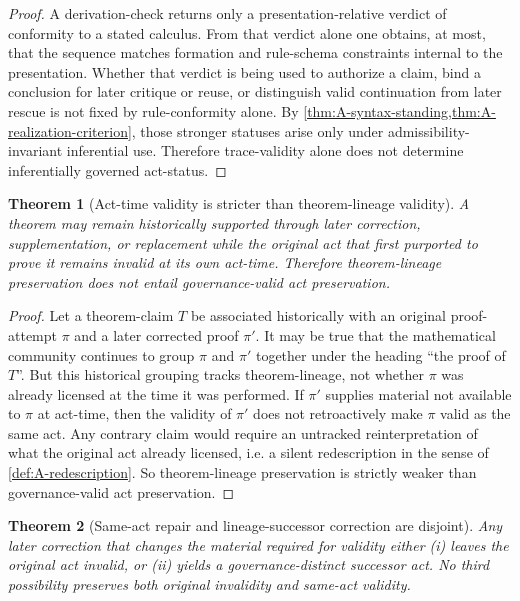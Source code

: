 \documentclass[11pt]{article}
\theoremstyle{plain}
\newtheorem{theorem}{Theorem}[section]
\theoremstyle{definition}
\begin{document}
\begin{proof}
A derivation-check returns only a presentation-relative verdict of conformity to a stated calculus. From that verdict alone one obtains, at most, that the sequence matches formation and rule-schema constraints internal to the presentation. Whether that verdict is being used to authorize a claim, bind a conclusion for later critique or reuse, or distinguish valid continuation from later rescue is not fixed by rule-conformity alone. By \cref{thm:A-syntax-standing,thm:A-realization-criterion}, those stronger statuses arise only under admissibility-invariant inferential use. Therefore trace-validity alone does not determine inferentially governed act-status.
\end{proof}

\begin{theorem}[Act-time validity is stricter than theorem-lineage validity]
\label{thm:A-acttime-stricter}
A theorem may remain historically supported through later correction, supplementation, or replacement while the original act that first purported to prove it remains invalid at its own act-time. Therefore theorem-lineage preservation does not entail governance-valid act preservation.
\end{theorem}

\begin{proof}
Let a theorem-claim $T$ be associated historically with an original proof-attempt $\pi$ and a later corrected proof $\pi'$. It may be true that the mathematical community continues to group $\pi$ and $\pi'$ together under the heading ``the proof of $T$''. But this historical grouping tracks theorem-lineage, not whether $\pi$ was already licensed at the time it was performed. If $\pi'$ supplies material not available to $\pi$ at act-time, then the validity of $\pi'$ does not retroactively make $\pi$ valid as the same act. Any contrary claim would require an untracked reinterpretation of what the original act already licensed, i.e. a silent redescription in the sense of \cref{def:A-redescription}. So theorem-lineage preservation is strictly weaker than governance-valid act preservation.
\end{proof}

\begin{theorem}[Same-act repair and lineage-successor correction are disjoint]
\label{thm:A-repair-disjoint}
Any later correction that changes the material required for validity either
(i) leaves the original act invalid, or
(ii) yields a governance-distinct successor act.
No third possibility preserves both original invalidity and same-act validity.
\end{theorem}
\end{document}
